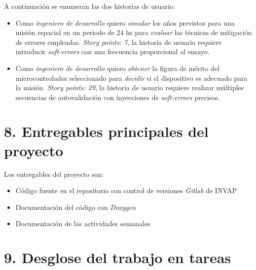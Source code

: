 \documentclass[
11pt, %
]{charter}
\begin{document}
A continuación se enumeran las dos historias de usuario:

\begin{itemize}
	\item Como \emph{ingeniero de desarrollo} quiero \emph{simular} los años previstos para una misión espacial en un periodo de 24 hs para \emph{evaluar} las técnicas de mitigación de errores empleadas. \emph{Story points: 7}, la historia de usuario requiere introducir \emph{soft-errors} con una frecuencia proporcional al ensayo.
	\item Como \emph{ingeniero de desarrollo} quiero \emph{obtener} la figura de mérito del microcontrolador seleccionado para \emph{decidir} si el dispositivo es adecuado para la misión. \emph{Story points: 29}, la historia de usuario requiere realizar múltiples secuencias de autovalidación con inyecciones de \emph{soft-errors} precisos.
\end{itemize}


\section{8. Entregables principales del proyecto}
\label{sec:entregables}

Los entregables del proyecto son:

\begin{itemize}
	\item Código fuente en el repositorio con control de versiones \emph{Gitlab} de INVAP
	\item Documentación del código con \emph{Doxygen}
	\item Documentación de las actividades semanales
\end{itemize}


\section{9. Desglose del trabajo en tareas}
\label{sec:wbs}
\end{document}

